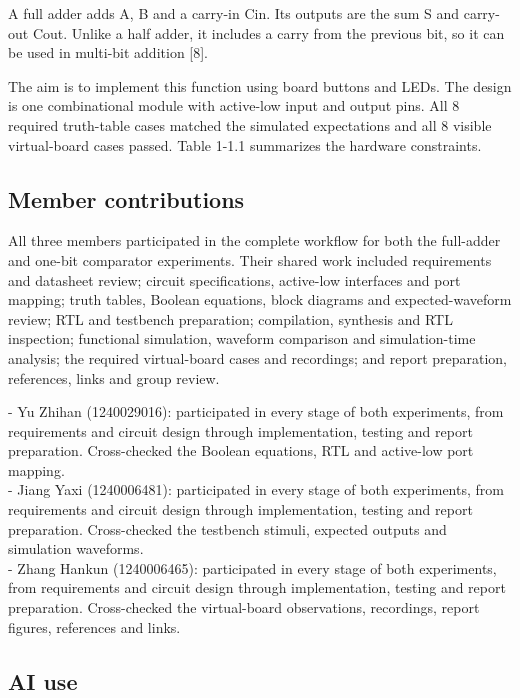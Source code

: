 \documentclass[10pt,a4paper]{article}
\begin{document}
A full adder adds A, B and a carry-in Cin. Its outputs are the sum S and carry-out Cout. Unlike a half adder, it includes a carry from the previous bit, so it can be used in multi-bit addition [8].\par

The aim is to implement this function using board buttons and LEDs. The design is one combinational module with active-low input and output pins. All 8 required truth-table cases matched the simulated expectations and all 8 visible virtual-board cases passed. Table 1-1.1 summarizes the hardware constraints.\par

\subsection*{Member contributions}

All three members participated in the complete workflow for both the full-adder and one-bit comparator experiments. Their shared work included requirements and datasheet review; circuit specifications, active-low interfaces and port mapping; truth tables, Boolean equations, block diagrams and expected-waveform review; RTL and testbench preparation; compilation, synthesis and RTL inspection; functional simulation, waveform comparison and simulation-time analysis; the required virtual-board cases and recordings; and report preparation, references, links and group review.\par

- Yu Zhihan (1240029016): participated in every stage of both experiments, from requirements and circuit design through implementation, testing and report preparation. Cross-checked the Boolean equations, RTL and active-low port mapping.\\
- Jiang Yaxi (1240006481): participated in every stage of both experiments, from requirements and circuit design through implementation, testing and report preparation. Cross-checked the testbench stimuli, expected outputs and simulation waveforms.\\
- Zhang Hankun (1240006465): participated in every stage of both experiments, from requirements and circuit design through implementation, testing and report preparation. Cross-checked the virtual-board observations, recordings, report figures, references and links.\par

\subsection*{AI use}
\end{document}
